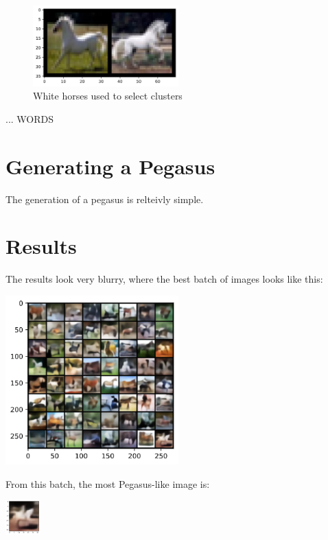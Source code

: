 \documentclass{article}
\begin{document}
\begin{figure}
    \begin{center}
        \includegraphics[width=0.5\textwidth]{figures/good_horses.png}
    \end{center}
    \caption{White horses used to select clusters}
    \label{fig:good_horses}
\end{figure}
...    WORDS

\section{Generating a Pegasus}
The generation of a pegasus is relteivly simple. 

\section{Results}
The results look very blurry, where the best batch of images looks like this:
\begin{center}
    \includegraphics[width=0.5\textwidth]{figures/kinda_allright64.png}
\end{center}
From this batch, the most Pegasus-like image is:
\begin{center}
    \includegraphics[width=0.1\textwidth]{figures/kinda_allright1.png}
\end{center}
\end{document}
